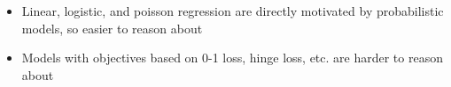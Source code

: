 
\begin{itemize}
\item Linear, logistic, and poisson regression are directly motivated
  by probabilistic models, so easier to reason about
\item Models with objectives based on 0-1 loss, hinge loss, etc. are
  harder to reason about
\end{itemize}


